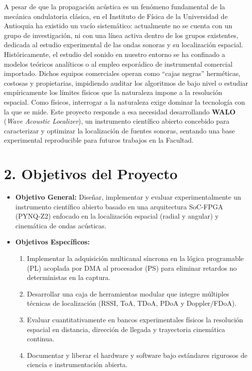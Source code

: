 \documentclass[10.5pt,letterpaper]{article}
\begin{document}
A pesar de que la propagación acústica es un fenómeno fundamental de la mecánica ondulatoria clásica, en el Instituto de Física de la Universidad de Antioquia ha existido un vacío sistemático: actualmente no se cuenta con un grupo de investigación, ni con una línea activa dentro de los grupos existentes, dedicada al estudio experimental de las ondas sonoras y su localización espacial. Históricamente, el estudio del sonido en nuestro entorno se ha confinado a modelos teóricos analíticos o al empleo esporádico de instrumental comercial importado. Dichos equipos comerciales operan como ``cajas negras'' herméticas, costosas y propietarias, impidiendo auditar los algoritmos de bajo nivel o estudiar empíricamente los límites físicos que la naturaleza impone a la resolución espacial. Como físicos, interrogar a la naturaleza exige dominar la tecnología con la que se mide. Este proyecto responde a esa necesidad desarrollando \textbf{WALO} (\textit{Wave Acoustic Localizer}), un instrumento científico abierto concebido para caracterizar y optimizar la localización de fuentes sonoras, sentando una base experimental reproducible para futuros trabajos en la Facultad.

\section*{2. Objetivos del Proyecto}
\begin{itemize}
    \item \textbf{Objetivo General:} Diseñar, implementar y evaluar experimentalmente un instrumento científico abierto basado en una arquitectura SoC-FPGA (PYNQ-Z2) enfocado en la localización espacial (radial y angular) y cinemática de ondas acústicas.
    \item \textbf{Objetivos Específicos:}
    \begin{enumerate}[label=\arabic*.]
        \item Implementar la adquisición multicanal síncrona en la lógica programable (PL) acoplada por DMA al procesador (PS) para eliminar retardos no deterministas en la captura.
        \item Desarrollar una caja de herramientas modular que integre múltiples técnicas de localización (RSSI, ToA, TDoA, PDoA y Doppler/FDoA).
        \item Evaluar cuantitativamente en bancos experimentales físicos la resolución espacial en distancia, dirección de llegada y trayectoria cinemática continua.
        \item Documentar y liberar el hardware y software bajo estándares rigurosos de ciencia e instrumentación abierta.
    \end{enumerate}
\end{itemize}
\end{document}
